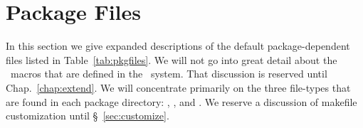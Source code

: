 \section{Package Files}
\label{sec:package_files}
In this section we give expanded descriptions of the default
package-dependent files listed in Table~\ref{tab:pkgfiles}.  We will
not go into great detail about the \cmake\ macros that are defined in the \draco\ system.  That discussion is
reserved until Chap.~\ref{chap:extend}.  We will concentrate primarily
on the three file-types that are found in each package directory:
, , and .  We reserve a discussion of makefile
customization until \S~\ref{sec:customize}.
